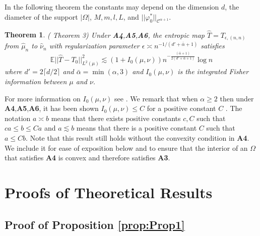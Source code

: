 \documentclass[nohyperref]{article}
\newtheorem{theorem}{Theorem}
\theoremstyle{definition}
\begin{document}
In the following theorem the constants may depend on the dimension $d$, the diameter of the support $|\Omega|$, $M, m, l, L$, and $||\varphi_0^*||_{\mathcal{C}^{\alpha+1}}$.
\begin{theorem}(\cite{pooladian2021entropic} Theorem 3) \label{thm:PNW} Under \textbf{A4},\textbf{A5},\textbf{A6}, the entropic map $\hat{T} = T_{\epsilon,(n,n)}$ from $\hat{\mu}_n$ to $\hat{\nu}_n$ with regularization parameter $\epsilon \asymp n^{-1/(d' + \bar{\alpha} + 1)}$ satisfies
\begin{equation}
    \mathbb{E}||\hat{T} - T_0||^2_{L^2(\mu)} \lesssim (1 + I_0(\mu,\nu))n^{-\frac{(\bar{\alpha} + 1)}{2(d' + \bar{\alpha} + 1)}}\log n
\end{equation}
where $d' = 2\lceil d/2 \rceil$ and $\bar{\alpha} = \min(\alpha, 3)$ and $I_0(\mu,\nu)$ is the integrated Fisher information between $\mu$ and $\nu$.
\end{theorem}
For more information on $I_0(\mu, \nu)$ see \cite{chizat2020faster}. We remark that when $\alpha \geq 2$ then under \textbf{A4},\textbf{A5},\textbf{A6}, it has been shown $I_0(\mu,\nu) \leq C$ for a positive constant $C$ \cite{chizat2020faster}. The notation $a \asymp b$ means that there exists positive constants $c,C$ such that $ca \leq b \leq Ca$ and $a \lesssim b$ means that there is a positive constant $C$ such that $a \leq Cb$. Note that this result still holds without the convexity condition in \textbf{A4}. We include it for ease of exposition below and to ensure that the interior of an $\Omega$ that satisfies \textbf{A4} is convex and therefore satisfies \textbf{A3}.

\section{Proofs of Theoretical Results}

\subsection{Proof of Proposition \ref{prop:Prop1}}\label{SM:Prop1Proof}
\end{document}
